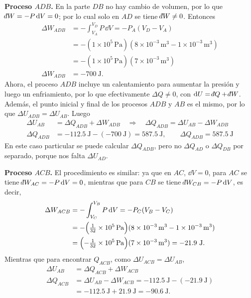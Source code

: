\begin{ejemplo}
\begin{solucion}
    \textbf{Proceso $ADB$.} En la parte $DB$ no hay cambio de volumen, por lo que
    $\dbar W=-P\,\dd V=0$; por lo cual solo en $AD$ se tiene $\dbar W\neq0$. Entonces
    \begin{align*}
      \Delta W_{ADB}&=-\int_{V_A}^{V_D}P\,\dd V=-P_A(V_D-V_A)\\
      &=-(1\times10^{5}\,\mathrm{Pa})(8\times10^{-3}\,\mathrm{m^3}-1\times10^{-3}\,\mathrm{m^3})\\
      &=-(1\times10^{5}\,\mathrm{Pa})(7\times10^{-3}\,\mathrm{m^3})\\
      \Delta W_{ADB}&=-700\ \mathrm{J}.
    \end{align*}
    Ahora, el proceso $ADB$ incluye un calentamiento para aumentar la presión y luego un
    enfriamiento, por lo que efectivamente $\Delta Q\neq0$, con $\dd U=\dbar Q+\dbar W$. Además,
    el punto inicial y final de los procesos $ADB$ y $AB$ es el mismo, por lo que
    $\Delta U_{ADB}=\Delta U_{AB}$. Luego
    \begin{align*}
      \Delta U_{AB}&=\Delta Q_{ADB}+\Delta W_{ADB}
        \quad\Longrightarrow\quad
        \Delta Q_{ADB}=\Delta U_{AB}-\Delta W_{ADB}\\
      \Delta Q_{ADB}&=-112.5\ \mathrm{J}-(-700\ \mathrm{J})=587.5\ \mathrm{J},
        \qquad\boxed{\Delta Q_{ADB}=587.5\ \mathrm{J}}
    \end{align*}
    En este caso particular se puede calcular $\Delta Q_{ADB}$, pero no $\Delta Q_{AD}$ o
    $\Delta Q_{DB}$ por separado, porque nos falta $\Delta U_{AD}$.

    \textbf{Proceso $ACB$.} El procedimiento es similar: ya que en $AC$, $\dd V=0$, para $AC$
    se tiene $\dbar W_{AC}=-P\,\dd V=0$, mientras que para $CB$ se tiene $\dbar W_{CB}=-P\,\dd V$, es
    decir,
    \begin{align*}
      \Delta W_{ACB}&=-\int_{V_C}^{V_B}P\,\dd V=-P_C(V_B-V_C)\\
      &=-\Bigl(\tfrac{1}{32}\times10^{5}\,\mathrm{Pa}\Bigr)(8\times10^{-3}\,\mathrm{m^3}-1\times10^{-3}\,\mathrm{m^3})\\
      &=\Bigl(-\tfrac{1}{32}\times10^{5}\,\mathrm{Pa}\Bigr)(7\times10^{-3}\,\mathrm{m^3})=-21.9\ \mathrm{J}.
    \end{align*}
    Mientras que para encontrar $Q_{ACB}$, como $\Delta U_{ACB}=\Delta U_{AB}$,
    \begin{align*}
      \Delta U_{AB}&=\Delta Q_{ACB}+\Delta W_{ACB}\\
      \Delta Q_{ACB}&=\Delta U_{AB}-\Delta W_{ACB}=-112.5\ \mathrm{J}-(-21.9\ \mathrm{J})\\
      &=-112.5\ \mathrm{J}+21.9\ \mathrm{J}=-90.6\ \mathrm{J}.
    \end{align*}
  \end{solucion}


\end{ejemplo}
